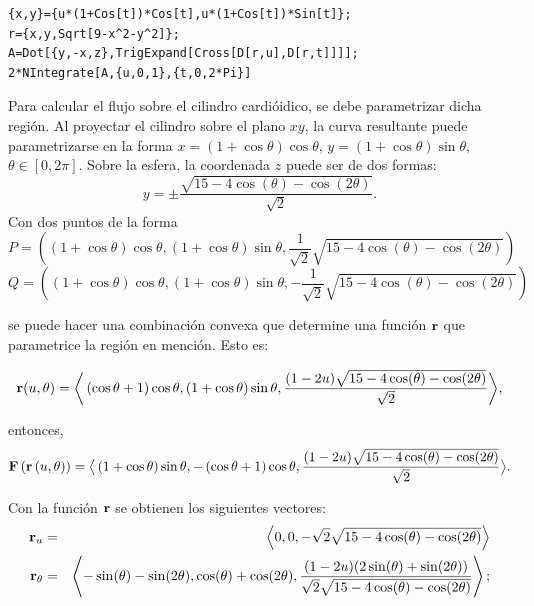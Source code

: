 \begin{parrafonumerado}
\begin{tcolorbox}[title=\bf Instrucción \verb"Mathematica"]\begin{Verbatim}[formatcom=\letraverbatim]
{x,y}={u*(1+Cos[t])*Cos[t],u*(1+Cos[t])*Sin[t]};
r={x,y,Sqrt[9-x^2-y^2]};
A=Dot[{y,-x,z},TrigExpand[Cross[D[r,u],D[r,t]]]];
2*NIntegrate[A,{u,0,1},{t,0,2*Pi}]
\end{Verbatim}
\end{tcolorbox}

Para calcular el flujo sobre el cilindro cardióidico, se debe parametrizar dicha región.
Al proyectar el cilindro sobre el plano $xy$, la curva resultante puede parametrizarse en la forma
$x=\left( 1+\cos \theta \right) \cos \theta $, $y=\left( 1+\cos \theta\right) \sin \theta $, $\theta \in [0,2\pi]$.
Sobre la esfera, la coordenada $z$ puede ser de dos formas:
\[y = \pm \frac{\sqrt{15-4\cos(\theta)-\cos(2\theta)}}{\sqrt{2}}.\]
Con dos puntos de la forma
{\small
\[P=\left(\left( 1+\cos \theta \right) \cos \theta, \left( 1+\cos \theta \right) \sin \theta,\frac{1}{\sqrt{2}}\sqrt{15-4\cos(\theta)-\cos(2\theta)} \right )\]
\[Q=\left(\left( 1+\cos \theta \right)\cos\theta,\left(1+\cos\theta\right)\sin\theta,-\frac{1}{\sqrt{2}}\sqrt{15-4\cos(\theta)-\cos(2\theta)} \right)\]
}

se puede hacer una combinación convexa que determine una función ${\bf r}$ que parametrice la región en mención. Esto es:

{\footnotesize
\[{\bf r}(u,\theta ) =\bigg \langle \left( \cos \theta +1\right ) \cos \theta,\linebreak
(1+\cos\theta) \sin \theta, \frac{(1-2u)\sqrt{15-4\cos(\theta) -\cos(2\theta)}}{\sqrt{2}}\bigg\rangle,\]
}

entonces,
{\footnotesize
\[{\bf F}\left({\bf r}\left(u,\theta \right) \right)  \linebreak
=\big \langle \left( 1+\cos \theta \right) \sin \theta , -\left( \cos \theta +1\right) \cos \theta ,\frac{(1-2u)\sqrt{15-4\cos(\theta)-\cos(2\theta)}}{\sqrt{2}} \big \rangle.\]
}

Con la función ${\bf r}$ se obtienen los siguientes vectores:
{\footnotesize
\begin{eqnarray*}
{\bf r}_{u} &=& \left \langle 0,0,-\sqrt{2}\sqrt{15-4\cos(\theta)-\cos(2\theta)}\right\rangle \\
{\bf r}_{\theta}&=& \left\langle -\sin(\theta)-\sin(2\theta),\cos(\theta)+\cos(2\theta),\frac{(1-2u)(2\sin(\theta)+\sin(2\theta))}{\sqrt{2}\sqrt{15-4\cos(\theta)-\cos(2\theta)}} \right \rangle;
\end{eqnarray*}
}


\end{parrafonumerado}
